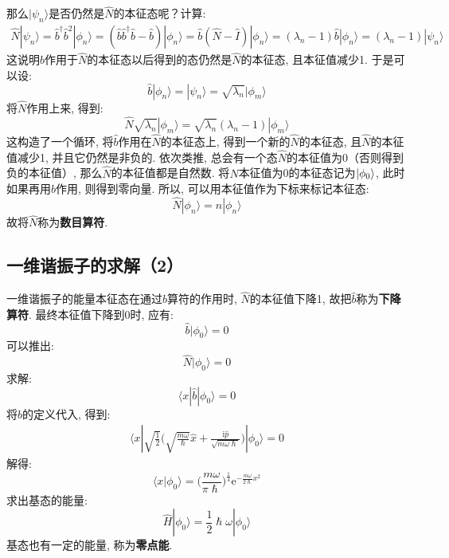         那么$|\psi_n\rangle$是否仍然是$\hat{N}$的本征态呢？计算:
        \begin{equation}\begin{aligned}
            \hat{N}|\psi_n\rangle = \hat{b}^\dagger\hat{b}^2|\phi_n\rangle = (\hat{b}\hat{b}^\dagger\hat{b}- \hat{b})|\phi_n\rangle = \hat{b}(\hat{N}-\hat{I})|\phi_n\rangle = (\lambda_n-1)\hat{b}|\phi_n\rangle = (\lambda_n - 1)|\psi_n\rangle
        \end{aligned}\end{equation}
        这说明$\hat{b}$作用于$\hat{N}$的本征态以后得到的态仍然是$\hat{N}$的本征态, 
        且本征值减少1. 于是可以设:
        \[ \hat{b}|\phi_n\rangle = |\psi_n\rangle = \sqrt{\lambda_n}|\phi_m\rangle \]
        将$\hat{N}$作用上来, 得到:
        \[ \hat{N}\sqrt{\lambda_n}|\phi_m \rangle = \sqrt{\lambda_n}(\lambda_n-1)|\phi_m\rangle \]
        这构造了一个循环, 将$\hat{b}$作用在$\hat{N}$的本征态上, 
        得到一个新的$\hat{N}$的本征态, 且$\hat{N}$的本征值减少1, 
        并且它仍然是非负的. 依次类推, 总会有一个态$\hat{N}$的本征值为0（否则得到负的本征值）, 
        那么$\hat{N}$的本征值都是自然数. 将$\hat{N}$本征值为0的本征态记为$\ket{\phi_0}$, 
        此时如果再用$\hat{b}$作用, 则得到零向量. 所以, 可以用本征值作为下标来标记本征态:
        \[ \hat{N}|\phi_n \rangle = n|\phi_n\rangle \]
        故将$\hat{N}$称为\textbf{数目算符}.

    \subsection{一维谐振子的求解（2）}
        一维谐振子的能量本征态在通过$\hat{b}$算符的作用时, $\hat{N}$的本征值下降1, 
        故把$\hat{b}$称为\textbf{下降算符}. 最终本征值下降到0时, 应有: 
        \[ \hat{b}|\phi_0 \rangle = 0 \]
        可以推出:
        \[ \hat{N}|\phi_0 \rangle = 0 \]
        求解:
        \[ \langle x|\hat{b}|\phi_0 \rangle = 0\]
        将$\hat{b}$的定义代入, 得到:
        \begin{equation}\begin{aligned}
            \langle x|\sqrt{\frac 12}\bigg(\sqrt{\frac {m\omega}{\hslash}}\hat{x}+ \frac {\mathrm{i}\hat{p}}{\sqrt{m\omega\hslash}}\bigg)|\phi_0 \rangle = 0
        \end{aligned}\end{equation}
        解得:
        \[ \langle x|\phi_0\rangle = \bigg(\frac {m\omega}{\pi\hslash} \bigg)^{\frac 14} \mathrm{e}^{-\frac {m\omega}{2\hslash}x^2} \]
        求出基态的能量:
        \[ \hat{H}|\phi_0 \rangle = \frac 12 \hslash \omega |\phi_0 \rangle \]
        基态也有一定的能量, 称为\textbf{零点能}.

